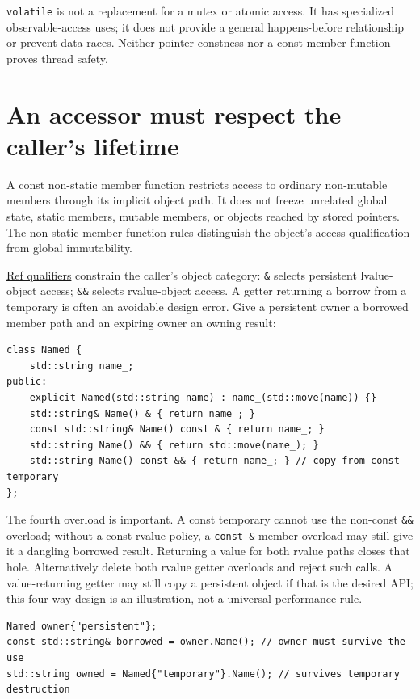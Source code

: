 \texttt{volatile} is not a replacement for a mutex or atomic access. It has specialized observable-access uses; it does not provide a general happens-before relationship or prevent data races. Neither pointer constness nor a const member function proves thread safety.

\section{An accessor must respect the caller's lifetime}\label{01-foundations-i-ch003-an-accessor-must-respect-the-callers-lifetime}

A const non-static member function restricts access to ordinary non-mutable members through its implicit object path. It does not freeze unrelated global state, static members, mutable members, or objects reached by stored pointers. The \href{https://eel.is/c++draft/class.mfct.non.static}{non-static member-function rules} distinguish the object's access qualification from global immutability.

\hyperref[appendix-d42039b1d6f7]{Ref qualifiers} constrain the caller's object category: \texttt{\&} selects persistent lvalue-object access; \texttt{\&\&} selects rvalue-object access. A getter returning a borrow from a temporary is often an avoidable design error. Give a persistent owner a borrowed member path and an expiring owner an owning result:

\begin{verbatim}
class Named {
    std::string name_;
public:
    explicit Named(std::string name) : name_(std::move(name)) {}
    std::string& Name() & { return name_; }
    const std::string& Name() const & { return name_; }
    std::string Name() && { return std::move(name_); }
    std::string Name() const && { return name_; } // copy from const temporary
};
\end{verbatim}

The fourth overload is important. A const temporary cannot use the non-const \texttt{\&\&} overload; without a const-rvalue policy, a \texttt{const\ \&} member overload may still give it a dangling borrowed result. Returning a value for both rvalue paths closes that hole. Alternatively delete both rvalue getter overloads and reject such calls. A value-returning getter may still copy a persistent object if that is the desired API; this four-way design is an illustration, not a universal performance rule.

\begin{verbatim}
Named owner{"persistent"};
const std::string& borrowed = owner.Name(); // owner must survive the use
std::string owned = Named{"temporary"}.Name(); // survives temporary destruction
\end{verbatim}

